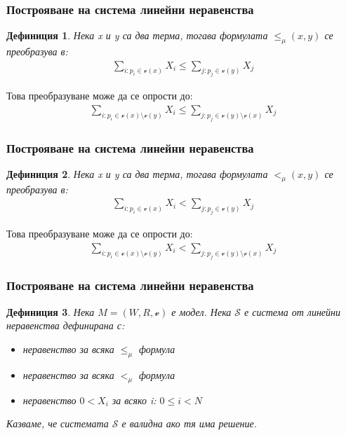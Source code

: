 \documentclass{beamer}
\newtheorem{defn}{Дефиниция}[section]
\newcommand{\vE}{\mathscr{v}}
\begin{document}
\begin{frame}\frametitle{Построяване на система линейни неравенства}
\begin{defn}
	Нека x и y са два терма, тогава формулата $\le_\mu(x, y)$ се преобразува в:
	\begin{align*}
		\sum_{i: p_i \in \vE(x)} X_i \leq \sum_{j: p_j \in \vE(y)} X_j
	\end{align*}
\end{defn}

		\begin{lemma}
			Това преобразуване може да се опрости до:
			\begin{align*}
				\sum_{i: p_i \in \vE(x) \setminus \vE(y)} X_i \leq \sum_{j: p_j \in \vE(y) \setminus \vE(x)} X_j
			\end{align*}
		\end{lemma}
\end{frame}

\begin{frame}\frametitle{Построяване на система линейни неравенства}
		\begin{defn}
			Нека x и y са два терма, тогава формулата $<_\mu(x, y)$ се преобразува в:
			\begin{align*}
				\sum_{i: p_i \in \vE(x)} X_i < \sum_{j: p_j \in \vE(y)} X_j
			\end{align*}
		\end{defn}

		\begin{lemma}
			Това преобразуване може да се опрости до:
			\begin{align*}
				\sum_{i: p_i \in \vE(x) \setminus \vE(y)} X_i < \sum_{j: p_j \in \vE(y) \setminus \vE(x)} X_j
			\end{align*}
		\end{lemma}
\end{frame}

\begin{frame}\frametitle{Построяване на система линейни неравенства}
		\begin{defn}
			Нека $M = (W, R, \vE)$ е модел. Нека $\mathscr{S}$ е система от линейни неравенства дефинирана с:
			\begin{itemize}
				\item неравенство за всяка $\le_\mu$ формула
				\item неравенство за всяка $<_\mu$ формула
				\item неравенство $0 < X_i$ за всяко i: $0 \le i < N$  
			\end{itemize}
			Казваме, че системата $\mathscr{S}$ е валидна ако тя има решение.
		\end{defn}
\end{frame}
\end{document}
